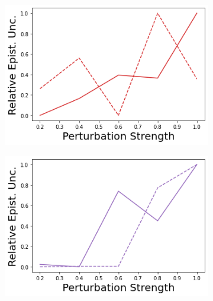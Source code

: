 \begin{figure}
    \begin{subfigure}{.245\textwidth}
        \includegraphics[width=\textwidth]{sections/011_icml2022/resources/transition_shift-DropOut-AcrobotShift-v0-mean_epistemic_uncertainty_.png}
    \end{subfigure}
    \begin{subfigure}{.245\textwidth}
        \includegraphics[width=\textwidth]{sections/011_icml2022/resources/transition_shift-Ensemble-AcrobotShift-v0-mean_epistemic_uncertainty_.png}
    \end{subfigure}
    \begin{subfigure}{.245\textwidth}

\end{subfigure}
\end{figure}
